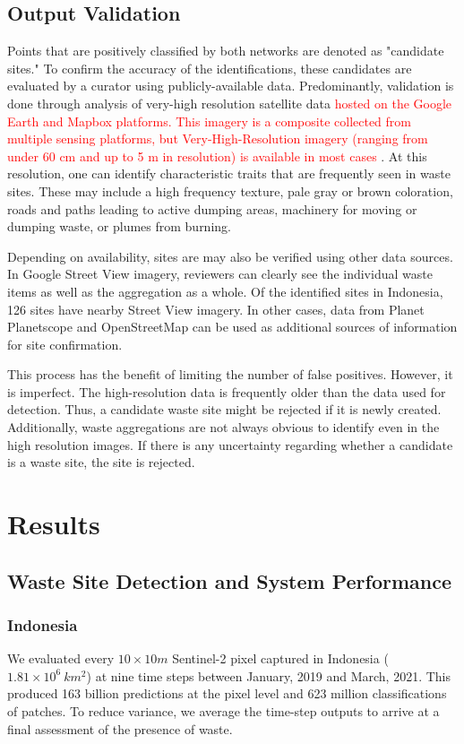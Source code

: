 \documentclass[10pt,letterpaper]{article}
\begin{document}
\subsection*{Output Validation} 
\label{sec:validation}
Points that are positively classified by both networks are denoted as "candidate sites." To confirm the accuracy of the identifications, these candidates are evaluated by a curator using publicly-available data. Predominantly, validation is done through analysis of very-high resolution satellite data \textcolor{red}{hosted on the Google Earth and Mapbox platforms. This imagery is a composite collected from multiple sensing platforms, but Very-High-Resolution imagery (ranging from under 60 cm and up to 5 m in resolution) is available in most cases \cite{lesiv2018characterizing}}. At this resolution, one can identify characteristic traits that are frequently seen in waste sites. These may include a high frequency texture, pale gray or brown coloration, roads and paths leading to active dumping areas, machinery for moving or dumping waste, or plumes from burning.

Depending on availability, sites are may also be verified using other data sources. In Google Street View imagery, reviewers can clearly see the individual waste items as well as the aggregation as a whole. Of the identified sites in Indonesia, 126 sites have nearby Street View imagery. In other cases, data from Planet Planetscope and OpenStreetMap can be used as additional sources of information for site confirmation.

This process has the benefit of limiting the number of false positives. However, it is imperfect. The high-resolution data is frequently older than the data used for detection. Thus, a candidate waste site might be rejected if it is newly created. Additionally, waste aggregations are not always obvious to identify even in the high resolution images. If there is any uncertainty regarding whether a candidate is a waste site, the site is rejected.

\section*{Results}
\label{sec:results}
\subsection*{Waste Site Detection and System Performance}
\subsubsection*{Indonesia}
We evaluated every $10\times10 m$ Sentinel-2 pixel captured in Indonesia ($1.81\times10^6\:km^2$) at nine time steps between January, 2019 and March, 2021. This produced 163 billion predictions at the pixel level and 623 million classifications of patches. To reduce variance, we average the time-step outputs to arrive at a final assessment of the presence of waste.
\end{document}
